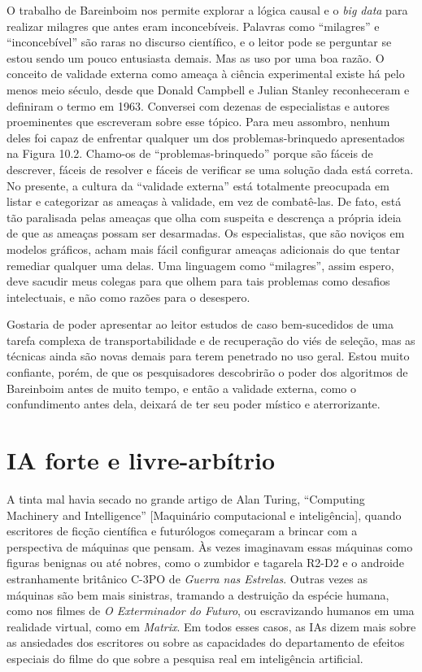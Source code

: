 \documentclass[11pt,a5paper,twoside]{book}
\begin{document}
O trabalho de Bareinboim nos permite explorar a lógica causal e o \textit{big data} para realizar milagres que antes eram inconcebíveis. Palavras como “milagres” e “inconcebível” são raras no discurso científico, e o leitor pode se perguntar se estou sendo um pouco entusiasta demais. Mas as uso por uma boa razão. O conceito de validade externa como ameaça à ciência experimental existe há pelo menos meio século, desde que Donald Campbell e Julian Stanley reconheceram e definiram o termo em 1963. Conversei com dezenas de especialistas e autores proeminentes que escreveram sobre esse tópico. Para meu assombro, nenhum deles foi capaz de enfrentar qualquer um dos problemas-brinquedo apresentados na Figura 10.2. Chamo-os de “problemas-brinquedo” porque são fáceis de descrever, fáceis de resolver e fáceis de verificar se uma solução dada está correta. No presente, a cultura da “validade externa” está totalmente preocupada em listar e categorizar as ameaças à validade, em vez de combatê-las. De fato, está tão paralisada pelas ameaças que olha com suspeita e descrença a própria ideia de que as ameaças possam ser desarmadas. Os especialistas, que são noviços em modelos gráficos, acham mais fácil configurar ameaças adicionais do que tentar remediar qualquer uma delas. Uma linguagem como “milagres”, assim espero, deve sacudir meus colegas para que olhem para tais problemas como desafios intelectuais, e não como razões para o desespero.

Gostaria de poder apresentar ao leitor estudos de caso bem-sucedidos de uma tarefa complexa de transportabilidade e de recuperação do viés de seleção, mas as técnicas ainda são novas demais para terem penetrado no uso geral. Estou muito confiante, porém, de que os pesquisadores descobrirão o poder dos algoritmos de Bareinboim antes de muito tempo, e então a validade externa, como o confundimento antes dela, deixará de ter seu poder místico e aterrorizante.

\section{IA forte e livre-arbítrio}
A tinta mal havia secado no grande artigo de Alan Turing, “Computing Machinery and Intelligence” [Maquinário computacional e inteligência], quando escritores de ficção científica e futurólogos começaram a brincar com a perspectiva de máquinas que pensam. Às vezes imaginavam essas máquinas como figuras benignas ou até nobres, como o zumbidor e tagarela R2-D2 e o androide estranhamente britânico C-3PO de \textit{Guerra nas Estrelas}. Outras vezes as máquinas são bem mais sinistras, tramando a destruição da espécie humana, como nos filmes de \textit{O Exterminador do Futuro}, ou escravizando humanos em uma realidade virtual, como em \textit{Matrix}. Em todos esses casos, as IAs dizem mais sobre as ansiedades dos escritores ou sobre as capacidades do departamento de efeitos especiais do filme do que sobre a pesquisa real em inteligência artificial.
\end{document}
